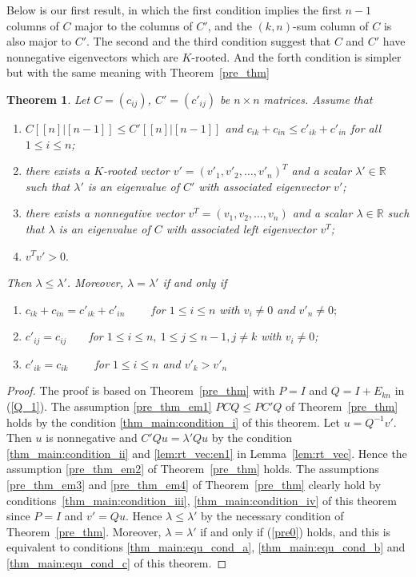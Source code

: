 \documentclass[12pt, a4paper]{article}
\theoremstyle{plain}
\newtheorem{thm}{Theorem}[section]
\theoremstyle{definition}
\begin{document}
Below is our first result, in which the first condition implies the first $n-1$ columns of $C$ major to
 the columns of $C'$, and the $(k,n)$-sum column of $C$ is also major to $C'$. The second and the third condition
 suggest that $C$ and $C'$ have nonnegative eigenvectors which are $K$-rooted. And the forth condition is simpler
  but with the same meaning with Theorem~\ref{pre_thm}
\begin{thm}\label{thm_main}
    Let $C=(c_{ij})$, $C'=(c'_{ij})$ be  $n\times n$ matrices.
Assume that
\begin{enumerate}[label=(\roman*)]
\item \label{thm_main:condition_i} $C[[n]|[n-1]]\leq C'[[n]|[n-1]]$ and $c_{ik}+c_{in}\leq c'_{ik}+c'_{in}$ for all $1\leq i\leq n$;
\item \label{thm_main:condition_ii} there exists a $K$-rooted vector $v'=(v'_1, v'_2, \ldots, v'_n)^T$ and a scalar
 $\lambda'\in \mathbb{R}$ such that $\lambda'$ is an eigenvalue of $C'$ with associated eigenvector $v'$;
\item \label{thm_main:condition_iii}there exists a nonnegative vector $v^T=(v_1, v_2, \ldots, v_n)$ and a scalar
 $\lambda\in \mathbb{R}$ such that $\lambda$ is an eigenvalue of $C$ with associated left eigenvector $v^T$;
\item \label{thm_main:condition_iv}$v^Tv'>0.$
\end{enumerate}
 Then $\lambda\leq \lambda'$.
Moreover, $\lambda=\lambda'$
if and only if
\begin{enumerate}[label=(\alph*)]
    \item \label{thm_main:equ_cond_a} $c_{ik}+c_{in}=c'_{ik}+c'_{in} \qquad$  for $1\leq i\leq n$ with $v_i\not=0$ and $v'_n\not=0;$
    \item \label{thm_main:equ_cond_b} $c'_{ij}=c_{ij}\qquad $for $1\leq i\leq n,~1\leq j\leq n-1, j \neq k $ with $v_i\ne 0 $;
    \item \label{thm_main:equ_cond_c} $c'_{ik}=c_{ik} \qquad $  for $1\leq i \leq n$ and $ v'_{k}>v'_n$
\end{enumerate} %
\end{thm}
%


\begin{proof}
    The proof is based on Theorem~\ref{pre_thm} with $P = I$ and $Q = I + E_{kn}$ in (\ref{Q_1}).
    The assumption \ref{pre_thm_em1} $PCQ\leq PC'Q$ of Theorem~\ref{pre_thm} holds by the condition \ref{thm_main:condition_i} of this theorem.
    Let $u = Q^{-1}v'$. Then $u$ is nonnegative and $C'Qu = \lambda' Qu$ by the condition \ref{thm_main:condition_ii} and \ref{lem:rt_vec:en1} in
     Lemma~\ref{lem:rt_vec}. Hence the assumption \ref{pre_thm_em2} of Theorem~\ref{pre_thm} holds. The assumptions \ref{pre_thm_em3} and \ref{pre_thm_em4}
      of Theorem~\ref{pre_thm} clearly hold by conditions~\ref{thm_main:condition_iii}, \ref{thm_main:condition_iv} of this theorem since $P = I$ and
       $v'= Qu$. Hence $\lambda \leq \lambda' $ by the necessary condition of Theorem~\ref{pre_thm}. Moreover,
        $\lambda = \lambda'$ if and only if (\ref{pre0}) holds, and this is equivalent to
         conditions \ref{thm_main:equ_cond_a}, \ref{thm_main:equ_cond_b} and \ref{thm_main:equ_cond_c} of this theorem.
\end{proof}
\end{document}
